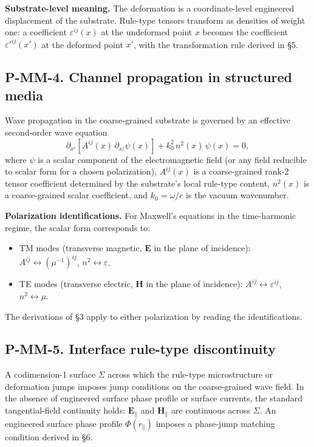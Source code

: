 \documentclass[11pt,a4paper]{article}
\begin{document}
\textbf{Substrate-level meaning.} The deformation is a coordinate-level engineered displacement of the substrate. Rule-type tensors transform as densities of weight one: a coefficient $\varepsilon^{ij}(x)$ at the undeformed point $x$ becomes the coefficient $\varepsilon'^{ij}(x')$ at the deformed point $x'$, with the transformation rule derived in \S5.

\subsection{P-MM-4. Channel propagation in structured media}

Wave propagation in the coarse-grained substrate is governed by an effective second-order wave equation
\[
\partial_{x^i}\!\left[A^{ij}(x)\,\partial_{x^j}\psi(x)\right] + k_0^2\,n^2(x)\,\psi(x) = 0,
\]
where $\psi$ is a scalar component of the electromagnetic field (or any field reducible to scalar form for a chosen polarization), $A^{ij}(x)$ is a coarse-grained rank-2 tensor coefficient determined by the substrate's local rule-type content, $n^2(x)$ is a coarse-grained scalar coefficient, and $k_0 = \omega/c$ is the vacuum wavenumber.

\textbf{Polarization identifications.} For Maxwell's equations in the time-harmonic regime, the scalar form corresponds to:
\begin{itemize}[noitemsep]
\item TM modes (transverse magnetic, $\mathbf{E}$ in the plane of incidence): $A^{ij} \leftrightarrow (\mu^{-1})^{ij}$, $n^2 \leftrightarrow \varepsilon$.
\item TE modes (transverse electric, $\mathbf{H}$ in the plane of incidence): $A^{ij} \leftrightarrow \varepsilon^{ij}$, $n^2 \leftrightarrow \mu$.
\end{itemize}

The derivations of \S3 apply to either polarization by reading the identifications.

\subsection{P-MM-5. Interface rule-type discontinuity}

A codimension-1 surface $\Sigma$ across which the rule-type microstructure or deformation jumps imposes jump conditions on the coarse-grained wave field. In the absence of engineered surface phase profile or surface currents, the standard tangential-field continuity holds: $\mathbf{E}_\parallel$ and $\mathbf{H}_\parallel$ are continuous across $\Sigma$. An engineered surface phase profile $\Phi(r_\parallel)$ imposes a phase-jump matching condition derived in \S6.
\end{document}
